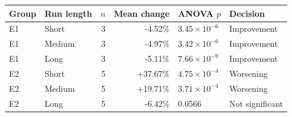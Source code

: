 \begin{tabular}{llrrll}\toprule
Group & Run length & $n$ & Mean change & ANOVA $p$ & Decision\\\midrule
E1 & Short & 3 & -4.52\% & $3.45\times10^{-6}$ & Improvement\\
E1 & Medium & 3 & -4.97\% & $3.42\times10^{-6}$ & Improvement\\
E1 & Long & 3 & -5.11\% & $7.66\times10^{-9}$ & Improvement\\
E2 & Short & 5 & +37.67\% & $4.75\times10^{-4}$ & Worsening\\
E2 & Medium & 5 & +19.71\% & $3.71\times10^{-4}$ & Worsening\\
E2 & Long & 5 & -6.42\% & 0.0566 & Not significant\\
\bottomrule\end{tabular}\par